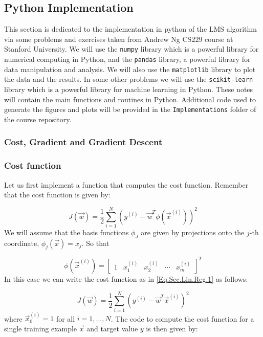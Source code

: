 \subsection{Python Implementation}

This section is dedicated to the implementation in python of the LMS algorithm via some problems and exercises taken from Andrew Ng  \textsc{CS229} course at Stanford University. We will use the \texttt{numpy} library which is a powerful library for numerical computing in Python, and the \texttt{pandas} library, a powerful library for data manipulation and analysis. We will also use the \texttt{matplotlib} library to plot the data and the results. In some other problems we will use the \texttt{scikit-learn} library which is a powerful library for machine learning in Python. These notes will contain the main functions and routines in Python. Additional code used to generate the figures and plots will be provided in the \faFolderOpen \texttt{Implementations} folder of the course repository. 

\subsubsection{Cost, Gradient and Gradient Descent}

\subsubsection*{Cost function}
Let us first implement a function that computes the cost function. Remember that the cost function is given by:	

\begin{equation}\label{Eq.Sec.Lin.Reg.8}
	J(\vec{w}) = \frac{1}{2}\sum_{i=1}^{N} (y^{(i)} - \vec{w}^T\phi(\vec{x}^{(i)}) )^2
\end{equation}	
We will assume that the basis functions $\phi_J$ are given by projections onto the $j$-th coordinate, \ie $\phi_j(\vec{x}) = x_j$. So that 

\[ \phi(\vec{x}^{(i)}) = \begin{bmatrix}
    1 & x_1^{(i)} & x_2^{(i)} & \cdots & x_m^{(i)}
\end{bmatrix}^{T} \]
In this case we can write the cost function as in \cref{Eq.Sec.Lin.Reg.1} as follows:

\begin{equation}\label{Eq.Sec.Lin.Reg.9}
	J(\vec{w}) = \frac{1}{2}\sum_{i=1}^{N} (y^{(i)} - \vec{w}^T \vec{x}^{(i)})^2
\end{equation}
where $\vec{x}_0^{(i)}=1$ for all $i=1,...,N$. The code to compute the cost function for a single training example $\vec{x}$ and target value $y$ is then given by: 

